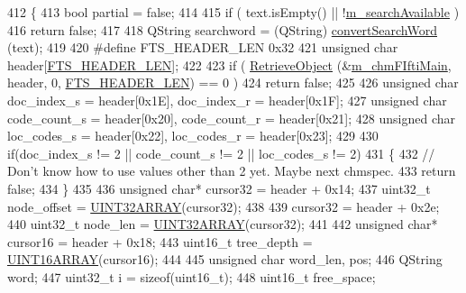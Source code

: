 \begin{DoxyCode}
412 \{
413     \textcolor{keywordtype}{bool} partial = \textcolor{keyword}{false};
414 
415     \textcolor{keywordflow}{if} ( text.isEmpty() || !\hyperlink{classLCHMFileImpl_a7f5f505b00220199785298bdad0627f6}{m\_searchAvailable} )
416         \textcolor{keywordflow}{return} \textcolor{keyword}{false};
417 
418     QString searchword = (QString) \hyperlink{classLCHMFileImpl_af271c732dfabab23d3d9a3aea235b983}{convertSearchWord} (text);
419 
420 \textcolor{preprocessor}{#define FTS\_HEADER\_LEN 0x32}
421     \textcolor{keywordtype}{unsigned} \textcolor{keywordtype}{char} header[\hyperlink{libchmfileimpl_8cpp_a6b364c5fb9d60b5ec54ddfed513257e0}{FTS\_HEADER\_LEN}];
422 
423     \textcolor{keywordflow}{if} ( \hyperlink{classLCHMFileImpl_a8535dce5eb8f22161ecf3510fde8aa4e}{RetrieveObject} (&\hyperlink{classLCHMFileImpl_aff4c9c66f19b11205e4cbdabc7b2d8aa}{m\_chmFIftiMain}, header, 0, 
      \hyperlink{libchmfileimpl_8cpp_a6b364c5fb9d60b5ec54ddfed513257e0}{FTS\_HEADER\_LEN}) == 0 )
424         \textcolor{keywordflow}{return} \textcolor{keyword}{false};
425     
426     \textcolor{keywordtype}{unsigned} \textcolor{keywordtype}{char} doc\_index\_s = header[0x1E], doc\_index\_r = header[0x1F];
427     \textcolor{keywordtype}{unsigned} \textcolor{keywordtype}{char} code\_count\_s = header[0x20], code\_count\_r = header[0x21];
428     \textcolor{keywordtype}{unsigned} \textcolor{keywordtype}{char} loc\_codes\_s = header[0x22], loc\_codes\_r = header[0x23];
429 
430     \textcolor{keywordflow}{if}(doc\_index\_s != 2 || code\_count\_s != 2 || loc\_codes\_s != 2)
431     \{
432         \textcolor{comment}{// Don't know how to use values other than 2 yet. Maybe next chmspec.}
433         \textcolor{keywordflow}{return} \textcolor{keyword}{false};
434     \}
435 
436     \textcolor{keywordtype}{unsigned} \textcolor{keywordtype}{char}* cursor32 = header + 0x14;
437     uint32\_t node\_offset = \hyperlink{bitfiddle_8h_a09e5156ae22f7b3ea6e8fe0f94084390}{UINT32ARRAY}(cursor32);
438 
439     cursor32 = header + 0x2e;
440     uint32\_t node\_len = \hyperlink{bitfiddle_8h_a09e5156ae22f7b3ea6e8fe0f94084390}{UINT32ARRAY}(cursor32);
441 
442     \textcolor{keywordtype}{unsigned} \textcolor{keywordtype}{char}* cursor16 = header + 0x18;
443     uint16\_t tree\_depth = \hyperlink{bitfiddle_8h_a4cdadd3f542d83f288d0b415c397fbb9}{UINT16ARRAY}(cursor16);
444 
445     \textcolor{keywordtype}{unsigned} \textcolor{keywordtype}{char} word\_len, pos;
446     QString word;
447     uint32\_t i = \textcolor{keyword}{sizeof}(uint16\_t);
448     uint16\_t free\_space;

\end{DoxyCode}
